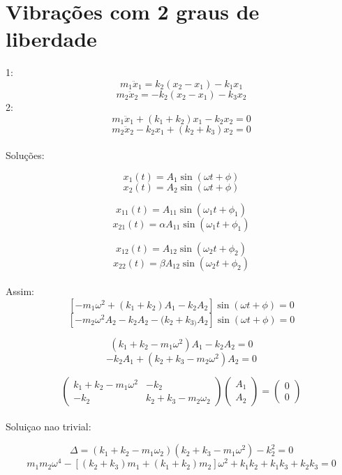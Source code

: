\section{Vibrações com 2 graus de liberdade}



1:
\[m_{1}\ddot{x}_{1}=k_{2}(x_{2}-x_{1})-k_{1}x_{1}\]
\[m_{2}\ddot{x}_{2}=-k_{2}(x_{2}-x_{1})-k_{3}x_{2}\]
2:
\[m_{1}\ddot{x}_{1}+(k_{1}+k_{2})x_{1}-k_{2}x_{2}=0\]
\[m_{2}\ddot{x}_{2}-k_{2}x_{1}+(k_{2}+k_{3})x_{2}=0\]
\\
Soluções:

\[x_{1}(t)=A_{1}\sin(\omega t + \phi)\]
\[x_{2}(t)=A_{2}\sin(\omega t + \phi)\]

\[x_{11}(t)=A_{11}\sin(\omega_{1} t + \phi _{1})\]
\[x_{21}(t)=\alpha A_{11}\sin(\omega_{1} t + \phi _{1})\]

\[x_{12}(t)=A_{12}\sin(\omega_{2} t + \phi _{2})\]
\[x_{22}(t)=\beta A_{12}\sin(\omega_{2} t + \phi _{2})\]
\\
Assim:
\[[-m_{1}\omega^{2}+(k_{1}+k_{2})A_{1}-k_{2}A_{2}]\sin(\omega t + \phi)=0\]
\[[-m_{2}\omega^{2}A_{2}-k_{2}A_{2}-(k_{2}+k_{3)}A_{2}]\sin(\omega t + \phi)=0\]

\[(k_{1}+k_{2}-m_{1}\omega^{2})A_{1}-k_{2}A_{2}=0\]
\[-k_{2}A_{1}+(k_{2}+k_{3}-m_{2}\omega^{2})A_{2}=0\]

\[\begin{pmatrix}
k_{1}+k_{2}-m_{1}\omega^{2} & -k_{2} \\ 
-k_{2} & k_{2}+k_{3}-m_{2}\omega_{2}
\end{pmatrix} \begin{pmatrix}
A_{1} \\ 
A_{2}
\end{pmatrix}=\begin{pmatrix}
0 \\ 
0
\end{pmatrix} \] 
\\

Soluiçao nao trivial:

\[\Delta=(k_{1}+k_{2}-m_{1}\omega_{2})(k_{2}+k_{3}-m_{1}\omega^{2})-k_{2}^{2}=0\]
\[m_{1}m_{2}\omega^{4}-[(k_{2}+k_{3})m_{1}+(k_{1}+k_{2})m_{2}]\omega^{2}+k_{1}k_{2}+k_{1}k_{3}+k_{2}k_{3}=0\]

